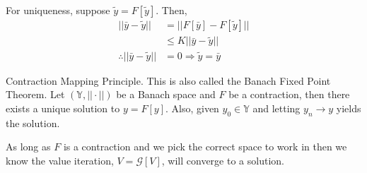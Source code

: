 \documentclass[lecture,12pt,]{pcms-l}
\theoremstyle{example}
\newcommand{\vsp}{(\mathbb{Y},||\cdot||)}
\begin{document}
For uniqueness, suppose $\tilde{y}=F[\tilde{y}]$. Then,
\begin{align*}
||\bar{y}-\tilde{y}|| &= ||F[\bar{y}]-F[\tilde{y}]|| \\
&\leq K||\bar{y}-\tilde{y}|| \\
\therefore ||\bar{y}-\tilde{y}|| &= 0 \Rightarrow \tilde{y} = \bar{y}
\end{align*}

\begin{theorem}{Contraction Mapping Principle.}
This is also called the Banach Fixed Point Theorem. Let $\vsp$ be a Banach space and $F$ be a contraction, then there exists a unique solution to $y=F[y]$. Also, given $y_0\in\mathbb{Y}$ and letting $y_n\to y$ yields the solution.
\end{theorem}

As long as $F$ is a contraction and we pick the correct space to work in then we know the value iteration, $V=\mathcal{G}[V]$, will converge to a solution.
\end{document}
